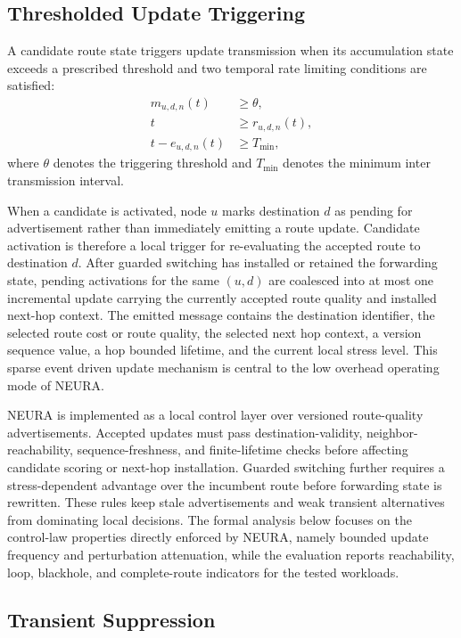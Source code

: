 \documentclass[5p,times]{elsarticle}
\begin{document}
\subsection{Thresholded Update Triggering}

A candidate route state triggers update transmission when its accumulation state exceeds a prescribed threshold and two temporal rate limiting conditions are satisfied:
\begin{align}
\label{eq:trigger-threshold}
m_{u,d,n}(t) &\geq \theta, \\
\label{eq:trigger-refractory}
t &\geq r_{u,d,n}(t), \\
\label{eq:trigger-mingap}
t - e_{u,d,n}(t) &\geq T_{\min},
\end{align}
where $\theta$ denotes the triggering threshold and $T_{\min}$ denotes the minimum inter transmission interval.

When a candidate is activated, node $u$ marks destination $d$ as pending for advertisement rather than immediately emitting a route update. Candidate activation is therefore a local trigger for re-evaluating the accepted route to destination $d$. After guarded switching has installed or retained the forwarding state, pending activations for the same $(u,d)$ are coalesced into at most one incremental update carrying the currently accepted route quality and installed next-hop context. The emitted message contains the destination identifier, the selected route cost or route quality, the selected next hop context, a version sequence value, a hop bounded lifetime, and the current local stress level. This sparse event driven update mechanism is central to the low overhead operating mode of NEURA.

NEURA is implemented as a local control layer over versioned route-quality advertisements. Accepted updates must pass destination-validity, neighbor-reachability, sequence-freshness, and finite-lifetime checks before affecting candidate scoring or next-hop installation. Guarded switching further requires a stress-dependent advantage over the incumbent route before forwarding state is rewritten. These rules keep stale advertisements and weak transient alternatives from dominating local decisions. The formal analysis below focuses on the control-law properties directly enforced by NEURA, namely bounded update frequency and perturbation attenuation, while the evaluation reports reachability, loop, blackhole, and complete-route indicators for the tested workloads.

\subsection{Transient Suppression}
\end{document}
